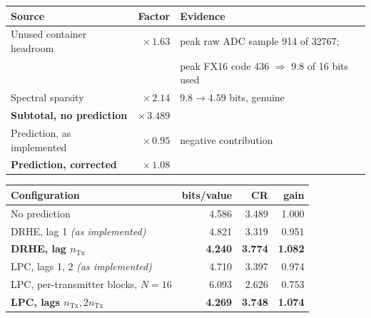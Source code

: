 \documentclass[10pt,a4paper]{article}
\newcommand{\tno}[1]{\textbf{#1}}
\begin{document}
\begin{center}
\begin{minipage}{0.98\textwidth}\centering
{}
\centering\small
\begin{tabular}{@{}lrl@{}}
\toprule
Source & Factor & Evidence\\
\midrule
Unused container headroom & $\times\,1.63$ & peak raw ADC sample \num{914} of \num{32767};\\
                          &                & peak FX16 code \num{436} $\Rightarrow$ \num{9.8} of \num{16} bits used\\
Spectral sparsity         & $\times\,2.14$ & $9.8 \rightarrow 4.59$ bits, genuine\\
\midrule
\tno{Subtotal, no prediction} & \tno{$\times\,3.489$} & \\
Prediction, as implemented    & \textcolor{warm}{$\times\,0.95$} & negative contribution\\
\tno{Prediction, corrected}   & \tno{$\times\,1.08$} & \\
\bottomrule
\end{tabular}
\end{minipage}
\end{center}

\begin{center}
\begin{minipage}{0.98\textwidth}\centering
{}
\centering\small
\begin{tabular}{@{}lrrr@{}}
\toprule
Configuration & bits/value & CR & gain\\
\midrule
No prediction                                  & 4.586 & 3.489 & 1.000\\
DRHE, lag 1 \emph{(as implemented)}            & 4.821 & 3.319 & \textcolor{warm}{0.951}\\
\tno{DRHE, lag $n_{\mathrm{Tx}}$}              & \tno{4.240} & \tno{3.774} & \tno{1.082}\\
LPC, lags 1, 2 \emph{(as implemented)}         & 4.710 & 3.397 & \textcolor{warm}{0.974}\\
LPC, per-transmitter blocks, $N=16$            & 6.093 & 2.626 & \textcolor{warm}{0.753}\\
\tno{LPC, lags $n_{\mathrm{Tx}}, 2n_{\mathrm{Tx}}$} & \tno{4.269} & \tno{3.748} & \tno{1.074}\\
\bottomrule
\end{tabular}
\end{minipage}
\end{center}
\end{document}
